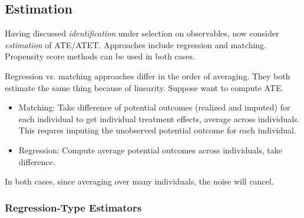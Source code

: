 \documentclass[12pt]{article}
\theoremstyle{plain}
\theoremstyle{definition}
\theoremstyle{remark}
\begin{document}
\clearpage
\subsection{Estimation}

Having discussed \emph{identification} under selection on observables,
now consider \emph{estimation} of ATE/ATET.
Approaches include regression and matching.
Propensity score methods can be used in both cases.

Regression vs. matching approaches differ in the order of
averaging. They both estimate the same thing because of
linearity. Suppose want to compute ATE.
\begin{itemize}
  \item Matching: Take difference of potential outcomes (realized and
    imputed) for each individual to get individual treatment effects,
    average across individuals.
    This requres imputing the unobserved potential outcome for each
    individual.
  \item Regression: Compute average potential outcomes across
    individuals, take difference.
\end{itemize}
In both cases, since averaging over many individuals, the noise will
cancel.





\subsubsection{Regression-Type Estimators}
\end{document}
